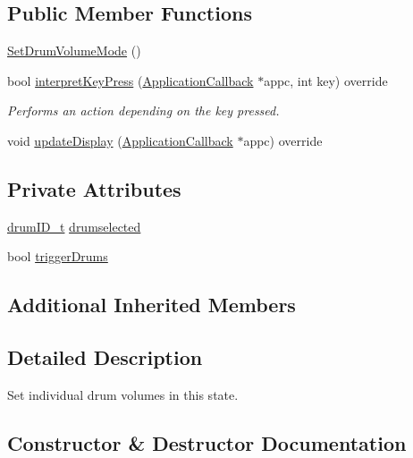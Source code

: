 \subsection*{Public Member Functions}
\begin{DoxyCompactItemize}
\item 
\hyperlink{classdrumpi_1_1SetDrumVolumeMode_a14818c6a553e0f9ba0fedd51f2842019}{Set\+Drum\+Volume\+Mode} ()
\item 
bool \hyperlink{classdrumpi_1_1SetDrumVolumeMode_a6b0029ed8934700699658f3b85a67639}{interpret\+Key\+Press} (\hyperlink{classdrumpi_1_1ApplicationCallback}{Application\+Callback} $\ast$appc, int key) override
\begin{DoxyCompactList}\small\item\em Performs an action depending on the key pressed. \end{DoxyCompactList}\item 
void \hyperlink{classdrumpi_1_1SetDrumVolumeMode_aee11645a25952da9cf8cbddf995f7b96}{update\+Display} (\hyperlink{classdrumpi_1_1ApplicationCallback}{Application\+Callback} $\ast$appc) override
\end{DoxyCompactItemize}
\subsection*{Private Attributes}
\begin{DoxyCompactItemize}
\item 
\hyperlink{namespacedrumpi_a3897274035c1b939a604438abe648b1b}{drum\+I\+D\+\_\+t} \hyperlink{classdrumpi_1_1SetDrumVolumeMode_aff08b8d0e7225b9fcdbda60f214b7c2d}{drumselected}
\item 
bool \hyperlink{classdrumpi_1_1SetDrumVolumeMode_a3f4b7caa7b969ad360e1306a239254e4}{trigger\+Drums}
\end{DoxyCompactItemize}
\subsection*{Additional Inherited Members}


\subsection{Detailed Description}
Set individual drum volumes in this state. 

\subsection{Constructor \& Destructor Documentation}
\mbox{\label{classdrumpi_1_1SetDrumVolumeMode_a14818c6a553e0f9ba0fedd51f2842019}} 

